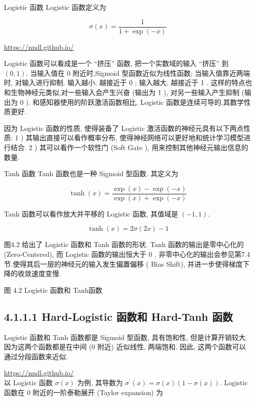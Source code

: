 \documentclass[10pt]{article}
\begin{document}
Logistic 函数 Logistic 函数定义为


\begin{equation*}
\sigma(x)=\frac{1}{1+\exp (-x)} \tag{4.4}
\end{equation*}


\href{https://nndl.github.io/}{https://nndl.github.io/}

Logistic 函数可以看成是一个 “挤压” 函数, 把一个实数域的输入 “挤压” 到 $(0,1)$. 当输入值在 0 附近时,Sigmoid 型函数近似为线性函数; 当输入值靠近两端时, 对输入进行抑制. 输入越小, 越接近于 0 ; 输入越大, 越接近于 1 . 这样的特点也和生物神经元类似,对一些输入会产生兴奋 (输出为 1 ), 对另一些输入产生抑制 (输出为 0 ). 和感知器使用的阶跃激活函数相比, Logistic 函数是连续可导的,其数学性质更好.

因为 Logistic 函数的性质, 使得装备了 Logistic 激活函数的神经元具有以下两点性质: 1 ) 其输出直接可以看作概率分布, 使得神经网络可以更好地和统计学习模型进行结合. 2 ) 其可以看作一个软性门 (Soft Gate ), 用来控制其他神经元输出信息的数量.

Tanh 函数 Tanh 函数也是一种 Sigmoid 型函数. 其定义为


\begin{equation*}
\tanh (x)=\frac{\exp (x)-\exp (-x)}{\exp (x)+\exp (-x)} \tag{4.5}
\end{equation*}


Tanh 函数可以看作放大并平移的 Logistic 函数, 其值域是 $(-1,1)$.


\begin{equation*}
\tanh (x)=2 \sigma(2 x)-1 \tag{4.6}
\end{equation*}


图4.2 给出了 Logistic 函数和 Tanh 函数的形状. Tanh 函数的输出是零中心化的 (Zero-Centered), 而 Logistic 函数的输出恒大于 0 . 非零中心化的输出会参见第7.4节.使得其后一层的神经元的输入发生偏置偏移 ( Bias Shift), 并进一步使得梯度下降的收敛速度变慢.



图 4.2 Logistic 函数和 Tanh函数

\subsection*{4.1.1.1 Hard-Logistic 函数和 Hard-Tanh 函数}
Logistic 函数和 Tanh 函数都是 Sigmoid 型函数, 具有饱和性, 但是计算开销较大. 因为这两个函数都是在中间 (0 附近) 近似线性, 两端饱和. 因此, 这两个函数可以通过分段函数来近似.

\href{https://nndl.github.io/}{https://nndl.github.io/}\\
以 Logistic 函数 $\sigma(x)$ 为例, 其导数为 $\sigma^{\prime}(x)=\sigma(x)(1-\sigma(x))$. Logistic 函数在 0 附近的一阶泰勒展开 (Taylor expansion) 为
\end{document}
